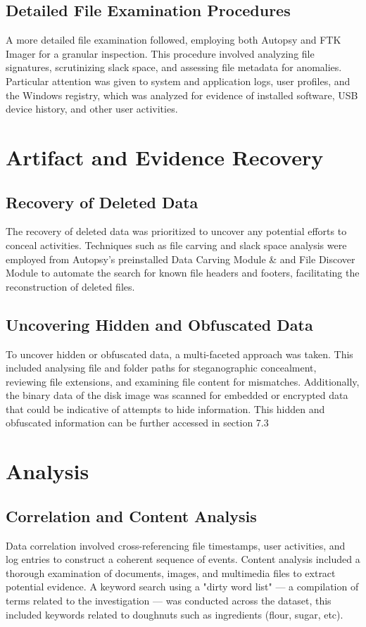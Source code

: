 \subsection{Detailed File Examination Procedures}
A more detailed file examination followed, employing both Autopsy and FTK Imager for a granular inspection. This procedure involved analyzing file signatures, scrutinizing slack space, and assessing file metadata for anomalies. Particular attention was given to system and application logs, user profiles, and the Windows registry, which was analyzed for evidence of installed software, USB device history, and other user activities.

\section{Artifact and Evidence Recovery}

\subsection{Recovery of Deleted Data}
The recovery of deleted data was prioritized to uncover any potential efforts to conceal activities. Techniques such as file carving and slack space analysis were employed from Autopsy's preinstalled Data Carving Module \& and File Discover Module to automate the search for known file headers and footers, facilitating the reconstruction of deleted files.

\subsection{Uncovering Hidden and Obfuscated Data}
To uncover hidden or obfuscated data, a multi-faceted approach was taken. This included analysing file and folder paths for steganographic concealment, reviewing file extensions, and examining file content for mismatches. Additionally, the binary data of the disk image was scanned for embedded or encrypted data that could be indicative of attempts to hide information. This hidden and obfuscated information can be further accessed in section 7.3

\section{Analysis}

\subsection{Correlation and Content Analysis}
Data correlation involved cross-referencing file timestamps, user activities, and log entries to construct a coherent sequence of events. Content analysis included a thorough examination of documents, images, and multimedia files to extract potential evidence. A keyword search using a "dirty word list" — a compilation of terms related to the investigation — was conducted across the dataset, this included keywords related to doughnuts such as ingredients (flour, sugar, etc).

